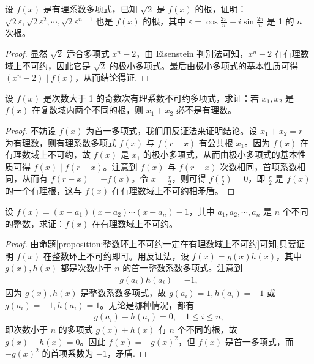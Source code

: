 \documentclass[../../main.tex]{subfiles}
\begin{document}
\begin{example}
设 $f(x)$ 是有理系数多项式，已知 $\sqrt{2}$ 是 $f(x)$ 的根，证明：$\sqrt{2} \varepsilon, \sqrt{2} \varepsilon^2, \cdots, \sqrt{2} \varepsilon^{n-1}$ 也是 $f(x)$ 的根，其中 $\varepsilon = \cos \frac{2\pi}{n} + i \sin \frac{2\pi}{n}$ 是 1 的 $n$ 次根。  
\end{example}
\begin{proof}
显然 $\sqrt{2}$ 适合多项式 $x^n - 2$，由 Eisenstein 判别法可知，$x^n - 2$ 在有理数域上不可约，因此它是 $\sqrt{2}$ 的极小多项式。最后由\hyperref[proposition:极小多项式的基本性质]{极小多项式的基本性质}可得 $(x^n - 2) \mid f(x)$，从而结论得证.
\end{proof}

\begin{example}
设 $f(x)$ 是次数大于 1 的奇数次有理系数不可约多项式，求证：若 $x_1, x_2$ 是 $f(x)$ 在复数域内两个不同的根，则 $x_1 + x_2$ 必不是有理数。
\end{example}
\begin{proof}
不妨设 $f(x)$ 为首一多项式，我们用反证法来证明结论。设 $x_1 + x_2 = r$ 为有理数，则有理系数多项式 $f(x)$ 与 $f(r - x)$ 有公共根 $x_1$。因为 $f(x)$ 在有理数域上不可约，故 $f(x)$ 是 $x_1$ 的极小多项式，从而由极小多项式的基本性质可得 $f(x) \mid f(r - x)$。注意到 $f(x)$ 与 $f(r - x)$ 次数相同，首项系数相同，从而有 $f(r - x) = -f(x)$。令 $x = \frac{r}{2}$，则可得 $f\left(\frac{r}{2}\right) = 0$，即 $\frac{r}{2}$ 是 $f(x)$ 的一个有理根，这与 $f(x)$ 在有理数域上不可约相矛盾。
\end{proof}

\begin{example}
设 $f(x) = (x - a_1)(x - a_2) \cdots (x - a_n) - 1$，其中 $a_1, a_2, \cdots, a_n$ 是 $n$ 个不同的整数，求证：$f(x)$ 在有理数域上不可约。
\end{example}
\begin{proof}
由\hyperref[proposition:整数环上不可约一定在有理数域上不可约]{命题\ref{proposition:整数环上不可约一定在有理数域上不可约}}可知,只要证明 $f(x)$ 在整数环上不可约即可。用反证法，设 $f(x) = g(x)h(x)$，其中 $g(x), h(x)$ 都是次数小于 $n$ 的首一整数系数多项式。注意到
\begin{align*}
g(a_i)h(a_i) = -1,
\end{align*}
因为 $g(x), h(x)$ 是整数系数多项式，故 $g(a_i) = 1, h(a_i) = -1$ 或 $g(a_i) = -1, h(a_i) = 1$。无论是哪种情况，都有
\begin{align*}
g(a_i) + h(a_i) = 0, \quad 1 \leq i \leq n,
\end{align*}
即次数小于 $n$ 的多项式 $g(x) + h(x)$ 有 $n$ 个不同的根，故 $g(x) + h(x) = 0$。因此 $f(x) = -g(x)^2$，但 $f(x)$ 是首一多项式，而 $-g(x)^2$ 的首项系数为 $-1$，矛盾.
\end{proof}
\end{document}
